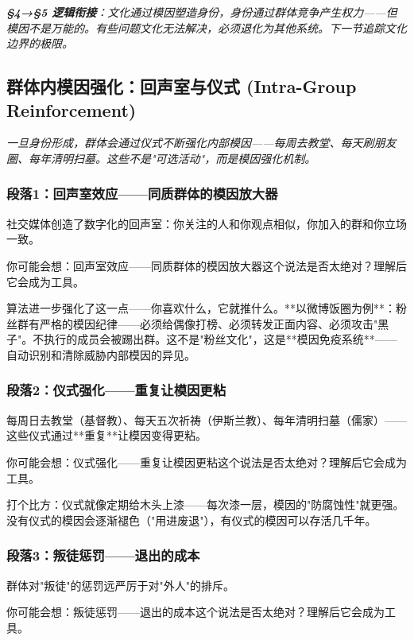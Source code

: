 \documentclass[a4paper,12pt]{book}
\newenvironment{motivation}{\begin{tcolorbox}[colback=gray!10,colframe=gray!60,title=\textit{动机}]\small\itshape}{\end{tcolorbox}}
\begin{document}
\begin{motivation}
\begin{motivation}
\begin{motivation}
	\textbf{§4→§5 逻辑衔接}：文化通过模因塑造身份，身份通过群体竞争产生权力——但模因不是万能的。有些问题文化无法解决，必须退化为其他系统。下一节追踪文化边界的极限。

	
	\subsection{群体内模因强化：回声室与仪式 (Intra-Group Reinforcement)}
	\begin{motivation}
		一旦身份形成，群体会通过仪式不断强化内部模因——每周去教堂、每天刷朋友圈、每年清明扫墓。这些不是"可选活动"，而是模因强化机制。
	\end{motivation}

	\subsubsection*{段落1：回声室效应——同质群体的模因放大器}
	社交媒体创造了数字化的回声室：你关注的人和你观点相似，你加入的群和你立场一致。
	\begin{tcolorbox}[colback=yellow!5, title=\textit{读者行为预测}]
		你可能会想：回声室效应——同质群体的模因放大器这个说法是否太绝对？理解后它会成为工具。
	\end{tcolorbox}

算法进一步强化了这一点——你喜欢什么，它就推什么。**以微博饭圈为例**：粉丝群有严格的模因纪律——必须给偶像打榜、必须转发正面内容、必须攻击"黑子"。不执行的成员会被踢出群。这不是"粉丝文化"，这是**模因免疫系统**——自动识别和清除威胁内部模因的异见。

	\subsubsection*{段落2：仪式强化——重复让模因更粘}
	每周日去教堂（基督教）、每天五次祈祷（伊斯兰教）、每年清明扫墓（儒家）——这些仪式通过**重复**让模因变得更粘。
	\begin{tcolorbox}[colback=yellow!5, title=\textit{读者行为预测}]
		你可能会想：仪式强化——重复让模因更粘这个说法是否太绝对？理解后它会成为工具。
	\end{tcolorbox}

打个比方：仪式就像定期给木头上漆——每次漆一层，模因的"防腐蚀性"就更强。没有仪式的模因会逐渐褪色（"用进废退"），有仪式的模因可以存活几千年。

	\subsubsection*{段落3：叛徒惩罚——退出的成本}
	群体对"叛徒"的惩罚远严厉于对"外人"的排斥。
	\begin{tcolorbox}[colback=yellow!5, title=\textit{读者行为预测}]
		你可能会想：叛徒惩罚——退出的成本这个说法是否太绝对？理解后它会成为工具。
	\end{tcolorbox}


\end{motivation}
\end{motivation}
\end{motivation}
\end{document}
